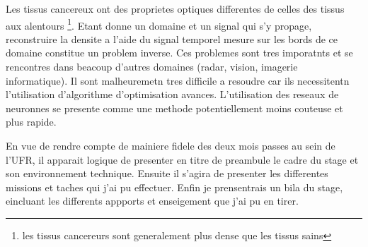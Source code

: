 Les tissus cancereux ont des proprietes optiques differentes de celles des tissus aux alentours \footnote{les tissus cancereurs sont generalement plus dense que les tissus sains}. Etant donne un domaine et un signal qui s'y propage, reconstruire la densite a l'aide du signal temporel mesure sur les bords de ce domaine constitue un problem inverse. Ces problemes sont tres imporatnts et se rencontres dans beacoup d'autres domaines (radar, vision, imagerie informatique). Il sont malheuremetn tres difficile a resoudre car ils necessitentn l'utilisation d'algorithme d'optimisation avances. L'utilisation des reseaux de neuronnes se presente comme une methode potentiellement moins couteuse et plus rapide.

En vue de rendre compte de mainiere fidele des deux mois passes au sein de l'UFR, il apparait logique de presenter en titre de preambule le cadre du stage et son environnement technique. Ensuite il s'agira de presenter les differentes missions et taches qui j'ai pu effectuer. Enfin je prensentrais un bila du stage, eincluant les differents appports et enseigement que j'ai pu en tirer.

